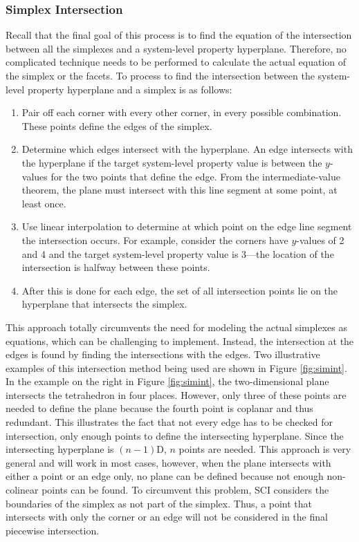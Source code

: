 \subsubsection{Simplex Intersection}
Recall that the final goal of this process is to find the equation of the intersection between all the simplexes and a system-level property hyperplane.
Therefore, no complicated technique needs to be performed to calculate the actual equation of the simplex or the facets.
To process to find the intersection between the system-level property hyperplane and a simplex is as follows:
\begin{enumerate}
   \item Pair off each corner with every other corner, in every possible combination. These points define the edges of the simplex.
   \item Determine which edges intersect with the hyperplane. An edge intersects with the hyperplane if the target system-level property value  is between the $y$-values for the two points that define the edge. From the intermediate-value theorem, the plane must intersect with this line segment at some point, at least once.
   \item Use linear interpolation to determine at which point on the edge line segment the intersection occurs. For example, consider the corners have $y$-values of 2 and 4 and the target system-level property value is 3---the location of the intersection is halfway between these points.
   \item After this is done for each edge, the set of all intersection points lie on the hyperplane that intersects the simplex.
\end{enumerate}
This approach totally circumvents the need for modeling the actual simplexes as equations, which can be challenging to implement.
Instead, the intersection at the edges is found by finding the intersections with the edges.
Two illustrative examples of this intersection method being used are shown in Figure \ref{fig:simint}.
In the example on the right in Figure \ref{fig:simint}, the two-dimensional plane intersects the tetrahedron in four places.
However, only three of these points are needed to define the plane because the fourth point is coplanar and thus redundant.
This illustrates the fact that not every edge has to be checked for intersection, only enough points to define the intersecting hyperplane.
Since the intersecting hyperplane is $(n-1)$D, $n$ points are needed.
This approach is very general and will work in most cases, however, when the plane intersects with either a point or an edge only, no plane can be defined because not enough non-colinear points can be found.
To circumvent this problem, SCI considers the boundaries of the simplex as not part of the simplex.
Thus, a point that intersects with only the corner or an edge will not be considered in the final piecewise intersection.


